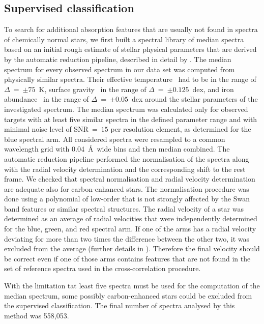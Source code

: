\subsection{Supervised classification}
\label{sec:supervised}
To search for additional absorption features that are usually not found in spectra of chemically normal stars, we first built a spectral library of median spectra based on an initial rough estimate of stellar physical parameters that are derived by the automatic reduction pipeline, described in detail by \citet{2017MNRAS.464.1259K}. The median spectrum for every observed spectrum in our data set was computed from physically similar spectra. Their effective temperature \Teff\ had to be in the range of $\Delta$\Teff~=~$\pm75$~K, surface gravity \Logg\ in the range of $\Delta$\Logg~=~$\pm0.125$~dex, and iron abundance \Feh\ in the range of $\Delta$\Feh~=~$\pm0.05$~dex around the stellar parameters of the investigated spectrum. The median spectrum was calculated only for observed targets with at least five similar spectra in the defined parameter range and with minimal noise level of SNR~=~$15$ per resolution element, as determined for the blue spectral arm. All considered spectra were resampled to a common wavelength grid with 0.04~\AA\ wide bins and then median combined. The automatic reduction pipeline \cite{2017MNRAS.464.1259K} performed the normalisation of the spectra along with the radial velocity determination and the corresponding shift to the rest frame. We checked that spectral normalisation and radial velocity determination are adequate also for carbon-enhanced stars. The normalisation procedure was done using a polynomial of low-order that is not strongly affected by the Swan band features or similar spectral structures. The radial velocity of a star was determined as an average of radial velocities that were independently determined for the blue, green, and red spectral arm. If one of the arms has a radial velocity deviating for more than two times the difference between the other two, it was excluded from the average (further details in \citet{2017MNRAS.464.1259K}). Therefore the final velocity should be correct even if one of those arms contains features that are not found in the set of reference spectra used in the cross-correlation procedure.

With the limitation tat least five spectra must be used for the computation of the median spectrum, some possibly carbon-enhanced stars could be excluded from the supervised classification. The final number of spectra analysed by this method was 558,053.

